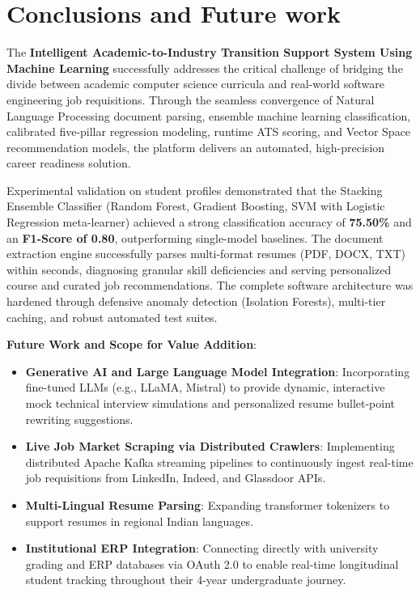 \documentclass[12pt,a4paper]{report}
\begin{document}

\chapter{Conclusions and Future work}
\begin{justify}
The \textbf{Intelligent Academic-to-Industry Transition Support System Using Machine Learning} successfully addresses the critical challenge of bridging the divide between academic computer science curricula and real-world software engineering job requisitions. Through the seamless convergence of Natural Language Processing document parsing, ensemble machine learning classification, calibrated five-pillar regression modeling, runtime ATS scoring, and Vector Space recommendation models, the platform delivers an automated, high-precision career readiness solution.

Experimental validation on student profiles demonstrated that the Stacking Ensemble Classifier (Random Forest, Gradient Boosting, SVM with Logistic Regression meta-learner) achieved a strong classification accuracy of \textbf{75.50\%} and an \textbf{F1-Score of 0.80}, outperforming single-model baselines. The document extraction engine successfully parses multi-format resumes (PDF, DOCX, TXT) within seconds, diagnosing granular skill deficiencies and serving personalized course and curated job recommendations. The complete software architecture was hardened through defensive anomaly detection (Isolation Forests), multi-tier caching, and robust automated test suites.
\end{justify}

\begin{justify}
\textbf{Future Work and Scope for Value Addition}:
\begin{itemize}
    \item \textbf{Generative AI and Large Language Model Integration}: Incorporating fine-tuned LLMs (e.g., LLaMA, Mistral) to provide dynamic, interactive mock technical interview simulations and personalized resume bullet-point rewriting suggestions.
    \item \textbf{Live Job Market Scraping via Distributed Crawlers}: Implementing distributed Apache Kafka streaming pipelines to continuously ingest real-time job requisitions from LinkedIn, Indeed, and Glassdoor APIs.
    \item \textbf{Multi-Lingual Resume Parsing}: Expanding transformer tokenizers to support resumes in regional Indian languages.
    \item \textbf{Institutional ERP Integration}: Connecting directly with university grading and ERP databases via OAuth 2.0 to enable real-time longitudinal student tracking throughout their 4-year undergraduate journey.
\end{itemize}
\end{justify}
\end{document}
